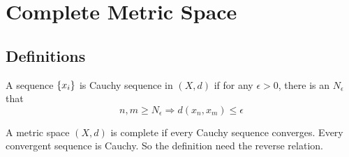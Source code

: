 \chapter{Complete Metric Space}


\section{Definitions}

\begin{definition}
    A sequence $\set{x_i}$ is Cauchy sequence in $(X, d)$ if for any $\epsilon > 0$, there is an $N_\epsilon$ that 
    \begin{equation}
        n, m \geq N_\epsilon \Rightarrow d(x_n, x_m) \leq \epsilon
    \end{equation}
\end{definition}

\begin{definition}
    A metric space $(X,d)$ is complete if every Cauchy sequence converges. Every convergent sequence is Cauchy. So the definition need the reverse relation.
\end{definition}


